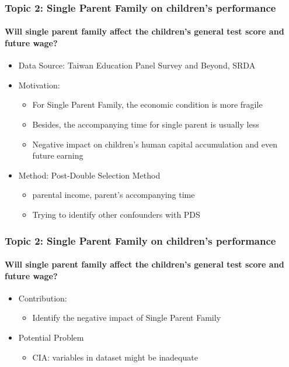 \documentclass{beamer}
\begin{document}
\begin{frame} %
\frametitle{Topic 2: Single Parent Family on children's performance}
\framesubtitle{Will single parent family affect the children's general test score and future wage?}
\begin{itemize}
    \item Data Source: Taiwan Education Panel Survey and Beyond, SRDA
    \item Motivation: 
    \begin{itemize}
        \item For Single Parent Family, the economic condition is more fragile
        \item Besides, the accompanying time for single parent is usually less
        \item Negative impact on children's human capital accumulation and even future earning
    \end{itemize} 
    \item Method: Post-Double Selection Method
    \begin{itemize}
        \item parental income, parent's accompanying time
        \item Trying to identify other confounders with PDS
    \end{itemize}
\end{itemize}
\end{frame}


\begin{frame} %
\frametitle{Topic 2: Single Parent Family on children's performance}
\framesubtitle{Will single parent family affect the children's general test score and future wage?}
\begin{itemize}
    \item Contribution: 
    \begin{itemize}
        \item Identify the negative impact of Single Parent Family
    \end{itemize}
    \item Potential Problem
    \begin{itemize}
        \item CIA: variables in dataset might be inadequate
    \end{itemize}
\end{itemize}
\end{frame}
\end{document}
